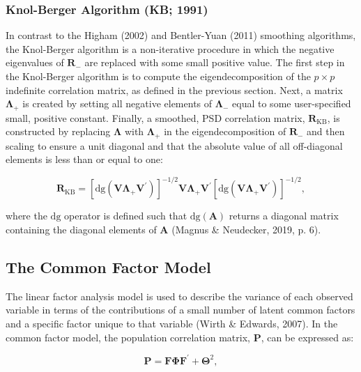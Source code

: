 \documentclass[
  english,
  man]{apa6}
\begin{document}
\hypertarget{knol-berger-algorithm-kb-1991}{%
\subsubsection{Knol-Berger Algorithm (KB; 1991)}\label{knol-berger-algorithm-kb-1991}}

In contrast to the Higham (2002) and Bentler-Yuan (2011) smoothing algorithms, the Knol-Berger algorithm is a non-iterative procedure in which the negative eigenvalues of \(\mathbf{R}_{-}\) are replaced with some small positive value. The first step in the Knol-Berger algorithm is to compute the eigendecomposition of the \(p \times p\) indefinite correlation matrix, as defined in the previous section. Next, a matrix \(\mathbf{\Lambda_+}\) is created by setting all negative elements of \(\mathbf{\Lambda}_-\) equal to some user-specified small, positive constant. Finally, a smoothed, PSD correlation matrix, \(\mathbf{R}_{\textrm{KB}}\), is constructed by replacing \(\mathbf{\Lambda}\) with \(\mathbf{\Lambda_+}\) in the eigendecomposition of \(\mathbf{R}_{-}\) and then scaling to ensure a unit diagonal and that the absolute value of all off-diagonal elements is less than or equal to one:

\begin{equation}
\mathbf{R}_{\textrm{KB}}= [\textrm{dg}(\mathbf{V \Lambda_+ V}^\prime)]^{-1/2} \mathbf{V \Lambda_+ V}^\prime [\textrm{dg}(\mathbf{V \Lambda_+ V}^\prime)]^{-1/2},
\label{eq:Rkb}
\end{equation}

where the \(\textrm{dg}\) operator is defined such that \(\textrm{dg}(\mathbf{A})\) returns a diagonal matrix containing the diagonal elements of \(\mathbf{A}\) (Magnus \& Neudecker, 2019, p. 6).

\hypertarget{the-common-factor-model}{%
\subsection{The Common Factor Model}\label{the-common-factor-model}}

The linear factor analysis model is used to describe the variance of each observed variable in terms of the contributions of a small number of latent common factors and a specific factor unique to that variable (Wirth \& Edwards, 2007). In the common factor model, the population correlation matrix, \(\mathbf{P}\), can be expressed as:

\begin{equation}
\mathbf{P} = \mathbf{F} \mathbf{\Phi} \mathbf{F}^{\prime} + \mathbf{\Theta}^2,
\label{eq:cfa}
\end{equation}
\end{document}
